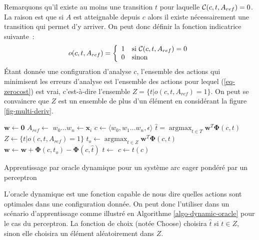 \documentclass[11pt,openany]{book}
\begin{document}
Remarquons qu'il existe au moins une transition $t$ pour laquelle 
${\cal C}(c,t,A_{ref}) = 0$. La raison est que si $A$ est atteignable
depuis $c$ alors il existe nécessairement une transition qui permet
d'y arriver. On peut donc définir la fonction indicatrice suivante~:
\begin{equation}
\label{eq-zerocost}
o(c,t,A_{ref}) = \left\{
\begin{array}{ll}
1 & \text{si } {\cal C}(c,t,A_{ref}) = 0\\
0 & \text{sinon} 
\end{array}\right.
\end{equation}
\'Etant donnée une configuration d'analyse $c$, 
l'ensemble des actions qui minimisent les erreurs d'analyse est
l'ensemble des actions pour lequel (\ref{eq-zerocost}) est vrai, c'est-à-dire 
 l'ensemble $Z = \{ t |  o(c,t,A_{ref})  = 1\}$. On peut se convaincre
 que $Z$ est un ensemble de plus d'un élément en considérant la figure \ref{fig-multi-deriv}.

\begin{algorithm}[htbp]
\scriptsize
\begin{algorithmic}[0]
\State $\mathbf{w} \gets \mathbf{0}$
\State $A_{ref} \gets$ 
\State $w_0\ldots w_n \gets \mathbf{x}_i$
\State $c \gets \langle w_0 , w_1\ldots w_n, \epsilon \rangle $
\State $\hat{t} = \mathop{\text{argmax}}_{t\in T} \mathbf{w}^T \boldsymbol\Phi(c,t)$
\State $Z \gets \{t | o(c,t,A_{ref}) = 1\}$
\State $t_o \gets \mathop{\text{argmax}}_{t\in Z} \mathbf{w}^T \boldsymbol\Phi(c,t)$
\State $\mathbf{w} \gets  \mathbf{w} + \boldsymbol\Phi(c,t_o) - \boldsymbol\Phi(c,\hat{t}) $
\EndIf
\State $t \gets  $
\State $c\gets t(c)$
\EndWhile
\EndFor
\EndFor
\EndFunction
\end{algorithmic}
\caption{\label{algo-dynamic-oracle}Apprentissage par oracle dynamique pour un système arc eager pondéré par un perceptron}
\end{algorithm}
L'oracle dynamique est une fonction capable de nous dire quelles
actions sont optimales dans une configuration donnée. On peut donc
l'utiliser dans un scénario d'apprentissage comme illustré en
Algorithme \ref{algo-dynamic-oracle} pour le cas du perceptron.
La fonction de choix (notée {\sc Choose})  choisira $\hat{t}$ si $t\in
Z$, sinon elle choisira un élément aléatoirement dans $Z$.
\end{document}
